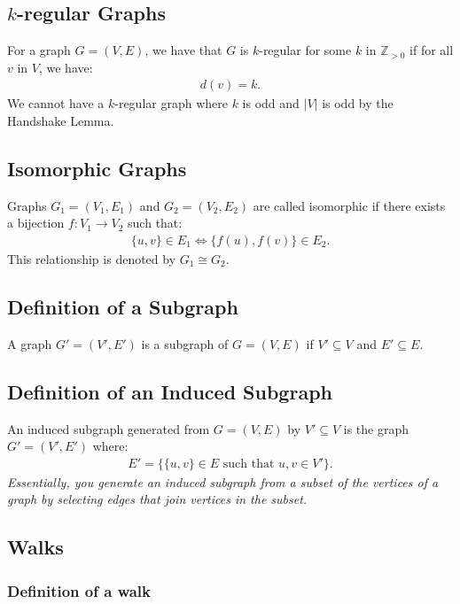 \documentclass[a4paper, 12pt, twoside]{article}
\begin{document}
\subsection{$k$-regular Graphs}

For a graph $G = (V, E)$, we have that $G$ is $k$-regular for some
$k$ in $\mathbb{Z}_{>0}$ if for all $v$ in $V$, we have: \begin{gather*}
  d(v) = k.
\end{gather*} We cannot have a $k$-regular graph where $k$ is odd
and $|V|$ is odd by the Handshake Lemma.

\subsection{Isomorphic Graphs}

Graphs $G_1 = (V_1, E_1)$ and $G_2 = (V_2, E_2)$ are called 
isomorphic if there exists a bijection $f : V_1 \to V_2$ such
that: \begin{gather*}
  \{u, v\} \in E_1 \Longleftrightarrow \{f(u), f(v)\} \in E_2.
\end{gather*} This relationship is denoted by $G_1 \cong G_2$.

\subsection{Definition of a Subgraph}

A graph $G' = (V', E')$ is a subgraph of $G = (V, E)$ if
$V' \subseteq V$ and $E' \subseteq E$.

\subsection{Definition of an Induced Subgraph}

An induced subgraph generated from $G = (V, E)$ by $V' \subseteq V$
is the graph $G' = (V', E')$ where: \begin{gather*} 
  E' = \{\{u, v\} \in E \text{ such that } u, v \in V'\}.
\end{gather*} \textit{Essentially, you generate an induced
subgraph from a subset of the vertices of a graph by selecting
edges that join vertices in the subset.}

\subsection{Walks}

\subsubsection{Definition of a walk}
\end{document}
